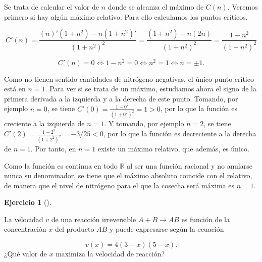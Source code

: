 \documentclass[
  spanish,
  a4paper,
]{scrreport}
\theoremstyle{definition}
\newtheorem{exercise}{Ejercicio}[chapter]
\theoremstyle{remark}
\begin{document}
\begin{tcolorbox}[enhanced jigsaw, arc=.35mm, bottomrule=.15mm, bottomtitle=1mm, breakable, colback=white, colbacktitle=quarto-callout-tip-color!10!white, colframe=quarto-callout-tip-color-frame, coltitle=black, left=2mm, leftrule=.75mm, opacityback=0, opacitybacktitle=0.6, rightrule=.15mm, title=\textcolor{quarto-callout-tip-color}{\faLightbulb}\hspace{0.5em}{Solución}, titlerule=0mm, toprule=.15mm, toptitle=1mm]

Se trata de calcular el valor de \(n\) donde se alcanza el máximo de
\(C(n)\). Veremos primero si hay algún máximo relativo. Para ello
calculamos los puntos críticos.

\[
C'(n)= \frac{(n)'(1+n^2)-n(1+n^2)'}{(1+n^2)^2} = \frac{(1+n^2)-n(2n)}{(1+n^2)^2} = \frac{1-n^2}{(1+n^2)^2}
\]

\[
C'(n)=0 \Leftrightarrow 1-n^2 = 0 \Leftrightarrow n^2 =1 \Leftrightarrow n=\pm 1.
\]

Como no tienen sentido cantidades de nitrógeno negativas, el único punto
crítico está en \(n=1\). Para ver si se trata de un máximo, estudiamos
ahora el signo de la primera derivada a la izquierda y a la derecha de
este punto. Tomando, por ejemplo \(n=0\), se tiene
\(C'(0) = \frac{1-0^2}{(1+0^2)^2} = 1>0\), por lo que la función es
creciente a la izquierda de \(n=1\). Y tomando, por ejemplo \(n=2\), se
tiene \(C'(2) = \frac{1-2^2}{(1+2^2)^2}=-3/25<0\), por lo que la función
es decreciente a la derecha de \(n=1\). Por tanto, en \(n=1\) existe un
máximo relativo, que además, es único.

Como la función es continua en todo \(\mathbb{R}\) al ser una función
racional y no anularse nunca su denominador, se tiene que el máximo
absoluto coincide con el relativo, de manera que el nivel de nitrógeno
para el que la cosecha será máxima es \(n=1\).

\end{tcolorbox}

\begin{exercise}[]\protect\hypertarget{exr-extremos-4}{}\label{exr-extremos-4}

La velocidad \(v\) de una reacción irreversible \(A+B\rightarrow AB\) es
función de la concentración \(x\) del producto \(AB\) y puede expresarse
según la ecuación

\[
v(x) = 4(3-x)(5-x).
\] ¿Qué valor de \(x\) maximiza la velocidad de reacción?

\end{exercise}
\end{document}
